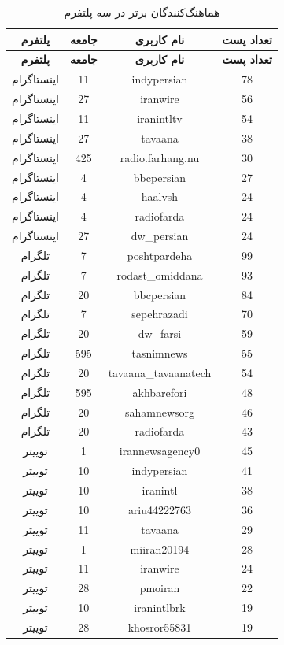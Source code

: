 \documentclass{article}
\begin{document}
	\begin{longtable}{|c|c|c|c|}
		\caption{هماهنگ‌کنندگان برتر در سه پلتفرم}
		\label{tab:top-coordinators}\\
		\hline
		\textbf{پلتفرم} & \textbf{جامعه} & \textbf{نام کاربری} & \textbf{تعداد پست} \\
		\hline
		\endfirsthead
		\hline
		\textbf{پلتفرم} & \textbf{جامعه} & \textbf{نام کاربری} & \textbf{تعداد پست} \\
		\hline
		\endhead
		\hline
		\endfoot
		اینستاگرام & 11 & indypersian & 78 \\
		اینستاگرام & 27 & iranwire & 56 \\
		اینستاگرام & 11 & iranintltv & 54 \\
		اینستاگرام & 27 & tavaana & 38 \\
		اینستاگرام & 425 & radio.farhang.nu & 30 \\
		اینستاگرام & 4 & bbcpersian & 27 \\
		اینستاگرام & 4 & haalvsh & 24 \\
		اینستاگرام & 4 & radiofarda & 24 \\
		اینستاگرام & 27 & dw\_persian & 24 \\
		\hline
		تلگرام & 7 & poshtpardeha & 99 \\
		تلگرام & 7 & rodast\_omiddana & 93 \\
		تلگرام & 20 & bbcpersian & 84 \\
		تلگرام & 7 & sepehrazadi & 70 \\
		تلگرام & 20 & dw\_farsi & 59 \\
		تلگرام & 595 & tasnimnews & 55 \\
		تلگرام & 20 & tavaana\_tavaanatech & 54 \\
		تلگرام & 595 & akhbarefori & 48 \\
		تلگرام & 20 & sahamnewsorg & 46 \\
		تلگرام & 20 & radiofarda & 43 \\
		\hline
		توییتر & 1 & irannewsagency0 & 45 \\
		توییتر & 10 & indypersian & 41 \\
		توییتر & 10 & iranintl & 38 \\
		توییتر & 10 & ariu44222763 & 36 \\
		توییتر & 11 & tavaana & 29 \\
		توییتر & 1 & miiran20194 & 28 \\
		توییتر & 11 & iranwire & 24 \\
		توییتر & 28 & pmoiran & 22 \\
		توییتر & 10 & iranintlbrk & 19 \\
		توییتر & 28 & khosror55831 & 19 \\
		\hline
	\end{longtable}
	
\end{document}
